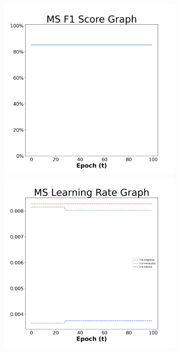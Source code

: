 \begin{figure}[H]
    \centering %
\begin{subfigure}{0.3\textwidth}
  \includegraphics[width=\linewidth]{images/exper2/iris/MS_0.01_f1.png}
    \includegraphics[width=\linewidth]{images/exper2/iris/MS_0.01_lr.png}

\end{subfigure}
\end{figure}

